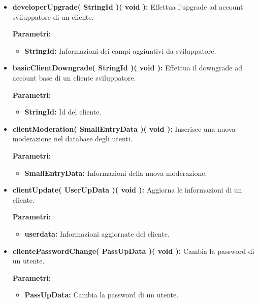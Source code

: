 \begin{itemize}
\begin{itemize}
			\item \textbf{developerUpgrade( StringId )( void ):} Effettua l'upgrade ad account sviluppatore di un cliente.
				\begin{description}
    				\item[\textbf{Parametri:}]
				\end{description}
				\begin{itemize}
					\item \textbf{StringId:} Informazioni dei campi aggiuntivi da sviluppatore.
				\end{itemize}
				
			\item \textbf{basicClientDowngrade( StringId )( void ):} Effettua il downgrade ad account base di un cliente sviluppatore.
				\begin{description}
    				\item[\textbf{Parametri:}]
				\end{description}
				\begin{itemize}
					\item \textbf{StringId:} Id del cliente.
				\end{itemize}
				
			\item \textbf{clientModeration( SmallEntryData )( void ):} Inserisce una nuova moderazione nel database degli utenti.
				\begin{description}
    				\item[\textbf{Parametri:}]
				\end{description}
				\begin{itemize}
					\item \textbf{SmallEntryData:} Informazioni della nuova moderazione.
				\end{itemize}
				
			\item \textbf{clientUpdate( UserUpData )( void ):} Aggiorna le informazioni di un cliente.
				\begin{description}
    				\item[\textbf{Parametri:}]
				\end{description}
				\begin{itemize}
					\item \textbf{userdata:} Informazioni aggiornate del cliente.
				\end{itemize}
			
			\item \textbf{clientePasswordChange( PassUpData )( void ):} Cambia la password di un utente.
				\begin{description}
					\item[\textbf{Parametri:}]
				\end{description}
				\begin{itemize}
					\item \textbf{PassUpData:} Cambia la password di un utente.
				\end{itemize}
		

\end{itemize}
\end{itemize}
